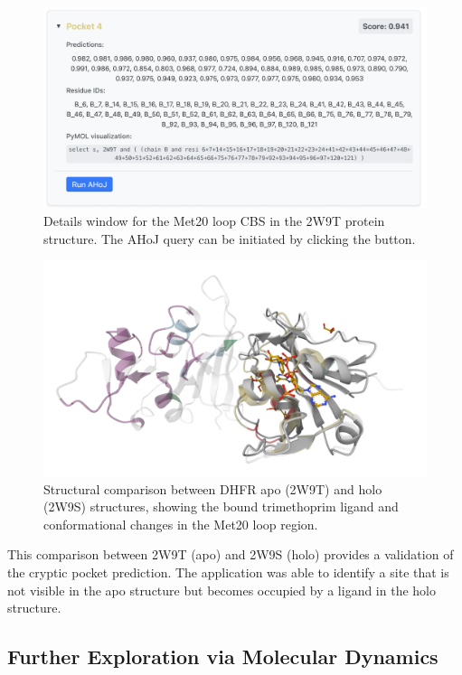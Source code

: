 \begin{figure}[htpb]
    \centering
    \includegraphics[width=\textwidth]{img/ahoj-btn.png}
    \caption{Details window for the Met20 loop CBS in the 2W9T protein structure. The AHoJ query can be initiated by clicking the button.}
    \label{fig:ahoj-btn}
\end{figure}

\begin{figure}[htpb]
    \centering
    \includegraphics[width=\textwidth]{img/2w9t_2w9s.png}
    \caption{Structural comparison between DHFR apo (2W9T) and holo (2W9S) structures, showing the bound trimethoprim ligand and conformational changes in the Met20 loop region.}
    \label{fig:2w9t_2w9s}
\end{figure}

This comparison between 2W9T (apo) and 2W9S (holo) provides a validation of the cryptic pocket prediction. The application was able to identify a site that is not visible in the apo structure but becomes occupied by a ligand in the holo structure.

\subsection{Further Exploration via Molecular Dynamics}
\label{subsec:md-exploration}

